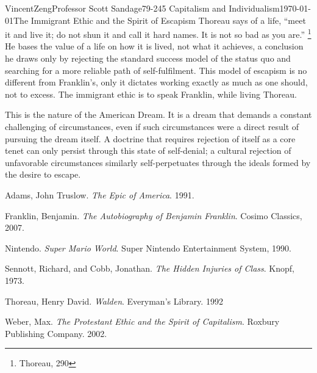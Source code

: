 \documentclass[12pt]{article}
\begin{document}
\begin{mla}{Vincent}{Zeng}{Professor Scott Sandage}{79-245 Capitalism and Individualism}{\today}{The Immigrant Ethic and the Spirit of Escapism}
Thoreau says of a life, ``meet it and live it; do not shun it and call it
hard names. It is not so bad as you are.'' \footnote{Thoreau, 290} He bases the value
of a life on how it is lived, not what it achieves, a conclusion he draws only by
rejecting the standard success model of the status quo and searching for a
more reliable path of self-fulfilment. This model of escapism is no different from
Franklin's, only it dictates working exactly as much as one should, not to excess.
The immigrant ethic is to speak Franklin, while living Thoreau. 

This is the nature of the
American Dream. It is a dream that demands a constant challenging of
circumstances, even if such circumstances were a direct result of
pursuing the dream itself. A doctrine that requires rejection of itself as a
core tenet can only persist through this state of self-denial; a cultural rejection of 
unfavorable circumstances similarly self-perpetuates through the ideals formed by
the desire to escape.

\end{mla}
\begin{workscited}
	\bibent
	Adams, John Truslow. \textit{The Epic of America}. 1991.

	\bibent
	Franklin, Benjamin. \textit{The Autobiography of Benjamin Franklin}. Cosimo Classics, 2007.

	\bibent
	Nintendo. \textit{Super Mario World}. Super Nintendo Entertainment System, 1990.

	\bibent
	Sennott, Richard, and Cobb, Jonathan. \textit{The Hidden Injuries of Class}. Knopf, 1973.
	
	\bibent
	Thoreau, Henry David. \textit{Walden}. Everyman's Library. 1992

	\bibent
	Weber, Max. \textit{The Protestant Ethic and the Spirit of Capitalism}.  Roxbury Publishing Company. 2002.

\end{workscited}
\end{document}
